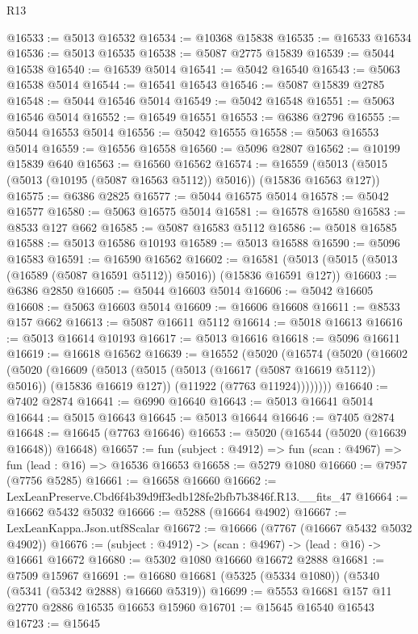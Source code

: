 \begin{lexlean}{R13}
\begin{coremodule}
@16533 := @5013 @16532
@16534 := @10368 @15838
@16535 := @16533 @16534
@16536 := @5013 @16535
@16538 := @5087 @2775 @15839
@16539 := @5044 @16538
@16540 := @16539 @5014
@16541 := @5042 @16540
@16543 := @5063 @16538 @5014
@16544 := @16541 @16543
@16546 := @5087 @15839 @2785
@16548 := @5044 @16546 @5014
@16549 := @5042 @16548
@16551 := @5063 @16546 @5014
@16552 := @16549 @16551
@16553 := @6386 @2796
@16555 := @5044 @16553 @5014
@16556 := @5042 @16555
@16558 := @5063 @16553 @5014
@16559 := @16556 @16558
@16560 := @5096 @2807
@16562 := @10199 @15839 @640
@16563 := @16560 @16562
@16574 := @16559 (@5013 (@5015 (@5013 (@10195 (@5087 @16563 @5112)) @5016)) (@15836 @16563 @127))
@16575 := @6386 @2825
@16577 := @5044 @16575 @5014
@16578 := @5042 @16577
@16580 := @5063 @16575 @5014
@16581 := @16578 @16580
@16583 := @8533 @127 @662
@16585 := @5087 @16583 @5112
@16586 := @5018 @16585
@16588 := @5013 @16586 @10193
@16589 := @5013 @16588
@16590 := @5096 @16583
@16591 := @16590 @16562
@16602 := @16581 (@5013 (@5015 (@5013 (@16589 (@5087 @16591 @5112)) @5016)) (@15836 @16591 @127))
@16603 := @6386 @2850
@16605 := @5044 @16603 @5014
@16606 := @5042 @16605
@16608 := @5063 @16603 @5014
@16609 := @16606 @16608
@16611 := @8533 @157 @662
@16613 := @5087 @16611 @5112
@16614 := @5018 @16613
@16616 := @5013 @16614 @10193
@16617 := @5013 @16616
@16618 := @5096 @16611
@16619 := @16618 @16562
@16639 := @16552
    (@5020
      (@16574
        (@5020
          (@16602
            (@5020
              (@16609
                (@5013 (@5015 (@5013 (@16617 (@5087 @16619 @5112)) @5016)) (@15836 @16619 @127))
                (@11922 (@7763 @11924))))))))
@16640 := @7402 @2874
@16641 := @6990 @16640
@16643 := @5013 @16641 @5014
@16644 := @5015 @16643
@16645 := @5013 @16644
@16646 := @7405 @2874
@16648 := @16645 (@7763 @16646)
@16653 := @5020 (@16544 (@5020 (@16639 @16648)) @16648)
@16657 := fun (subject : @4912) => fun (scan : @4967) => fun (lead : @16) => @16536 @16653
@16658 := @5279 @1080
@16660 := @7957 (@7756 @5285)
@16661 := @16658 @16660
@16662 := LexLeanPreserve.Cbd6f4b39d9ff3edb128fe2bfb7b3846f.R13.__fits_47
@16664 := @16662 @5432 @5032
@16666 := @5288 (@16664 @4902)
@16667 := LexLeanKappa.Json.utf8Scalar
@16672 := @16666 (@7767 (@16667 @5432 @5032 @4902))
@16676 := (subject : @4912) -> (scan : @4967) -> (lead : @16) -> @16661 @16672
@16680 := @5302 @1080 @16660 @16672 @2888
@16681 := @7509 @15967
@16691 := @16680 @16681 (@5325 (@5334 @1080)) (@5340 (@5341 (@5342 @2888) @16660 @5319))
@16699 := @5553 @16681 @157 @11 @2770 @2886 @16535 @16653 @15960
@16701 := @15645 @16540 @16543
@16723 := @15645

\end{coremodule}
\end{lexlean}
